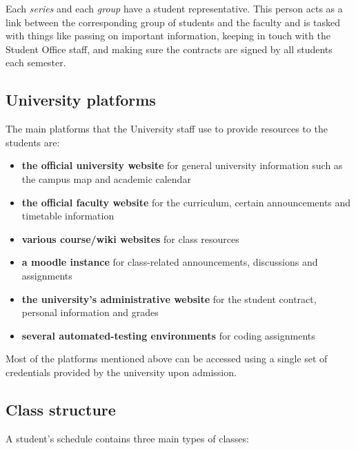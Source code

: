         Each \textit{series} and each \textit{group} have a student representative. This person acts as a link between the corresponding group of students and the faculty and is tasked with things like passing on important information, keeping in touch with the Student Office staff, and making sure the contracts are signed by all students each semester.
    
    \subsection{University platforms} \label{1:university_platforms}
    
        The main platforms that the University staff use to provide resources to the students are:
        
        \begin{itemize}
            \item \textbf{the official university website} for general university information such as the campus map and academic calendar
            \item \textbf{the official faculty website} for the curriculum, certain announcements and timetable information
            \item \textbf{various course/wiki websites} for class resources
            \item \textbf{a \gls{moodle} instance} for class-related announcements, discussions and assignments
            \item \textbf{the university's administrative website} for the student contract, personal information and grades
            \item \textbf{several automated-testing environments} for coding assignments
        \end{itemize}
    
        Most of the platforms mentioned above can be accessed using a single set of credentials provided by the university upon admission.
        
    \subsection{Class structure} \label{1:class_structure}
    
    A student's schedule contains three main types of classes:
    
